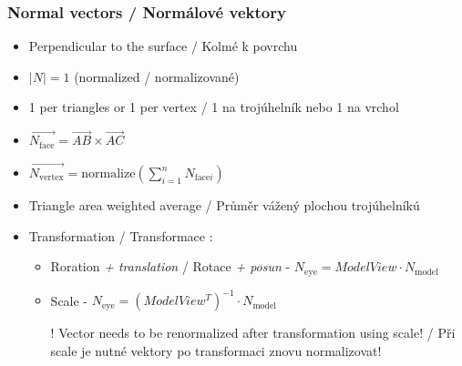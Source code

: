 \begin{frame}\frametitle{Normal vectors / Normálové vektory}\scriptsize

    \begin{itemize}
        \item Perpendicular to the surface / Kolmé k povrchu
        \item $\left| N \right| = 1$ (normalized / normalizované)
        \item 1 per triangles or 1 per vertex / 1 na trojúhelník nebo 1 na vrchol
        \vfill
        \item $\displaystyle \vec{N_{\mathrm{face}}} = \vec{AB} \times \vec{AC}$
        \item $\displaystyle \vec{N_{\mathrm{vertex}}} = \mathrm{normalize}\left( \sum\limits_{i=1}^n N_{\mathrm{face}i} \right)$
        \item Triangle area weighted average / Průměr vážený plochou trojúhelníkú
        \vfill
        \item Transformation / Transformace :
        \begin{itemize}
            \item Roration \emph{+ translation} / Rotace \emph{+ posun} - $N_{\mathrm{eye}} = ModelView \cdot N_{\mathrm{model}}$
            \item Scale - $N_{\mathrm{eye}} = (ModelView^T)^{-1} \cdot N_{\mathrm{model}}$
            \item[\color{red}!] Vector needs to be renormalized after transformation using scale! / Při scale je nutné vektory po transformaci znovu normalizovat!
        \end{itemize}
    \end{itemize}
\end{frame}

